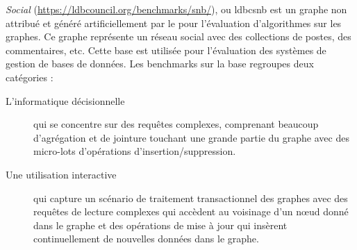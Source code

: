 \emph{Social} (\url{https://ldbcouncil.org/benchmarks/snb/}), ou \gls{ldbcsnb} est un graphe non attribué et généré artificiellement par le  pour l'évaluation d'algorithmes sur les graphes.
Ce graphe représente un réseau social avec des collections de postes, des commentaires, etc.
Cette base est utilisée pour l'évaluation des systèmes de gestion de bases de données.
Les benchmarks sur la base  regroupes deux catégories :
\begin{description}
    \item[L'informatique décisionnelle] qui se concentre sur des requêtes complexes, comprenant beaucoup d'agrégation et de jointure touchant une grande partie du graphe avec des micro-lots d'opérations d'insertion/suppression.
    \item[Une utilisation interactive] qui capture un scénario de traitement transactionnel des graphes avec des requêtes de lecture complexes qui accèdent au voisinage d'un nœud donné dans le graphe et des opérations de mise à jour qui insèrent continuellement de nouvelles données dans le graphe.
\end{description}

